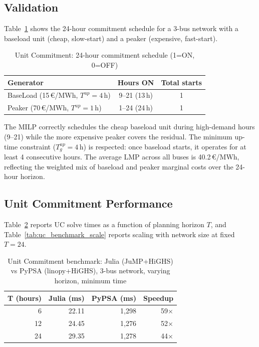 \subsection{Validation}

Table~\ref{tab:uc_result} shows the 24-hour commitment schedule for a 3-bus network with a baseload unit (cheap, slow-start) and a peaker (expensive, fast-start).

\begin{table}[H]
\centering
\caption{Unit Commitment: 24-hour commitment schedule (1=ON, 0=OFF)}
\label{tab:uc_result}
\begin{tabular}{lcc}
\toprule
\textbf{Generator} & \textbf{Hours ON} & \textbf{Total starts} \\
\midrule
BaseLoad (15\,\euro/MWh, $T^{up}=4$\,h) & 9--21 (13\,h) & 1 \\
Peaker   (70\,\euro/MWh, $T^{up}=1$\,h) & 1--24 (24\,h) & 1 \\
\bottomrule
\end{tabular}
\end{table}

The MILP correctly schedules the cheap baseload unit during high-demand hours (9--21) while the more expensive peaker covers the residual. The minimum up-time constraint ($T_g^{up} = 4$\,h) is respected: once baseload starts, it operates for at least 4 consecutive hours. The average LMP across all buses is 40.2\,\euro/MWh, reflecting the weighted mix of baseload and peaker marginal costs over the 24-hour horizon.

\subsection{Unit Commitment Performance}

Table~\ref{tab:uc_benchmark_t} reports UC solve times as a function of planning horizon $T$, and Table~\ref{tab:uc_benchmark_scale} reports scaling with network size at fixed $T = 24$.

\begin{table}[H]
\centering
\caption{Unit Commitment benchmark: Julia (JuMP+HiGHS) vs PyPSA (linopy+HiGHS), 3-bus network, varying horizon, minimum time}
\label{tab:uc_benchmark_t}
\begin{tabular}{rrrr}
\toprule
\textbf{T (hours)} & \textbf{Julia (ms)} & \textbf{PyPSA (ms)} & \textbf{Speedup} \\
\midrule
  6 &  22.11 & 1{,}298 &  59$\times$ \\
 12 &  24.45 & 1{,}276 &  52$\times$ \\
 24 &  29.35 & 1{,}278 &  44$\times$ \\
\bottomrule
\end{tabular}
\end{table}

